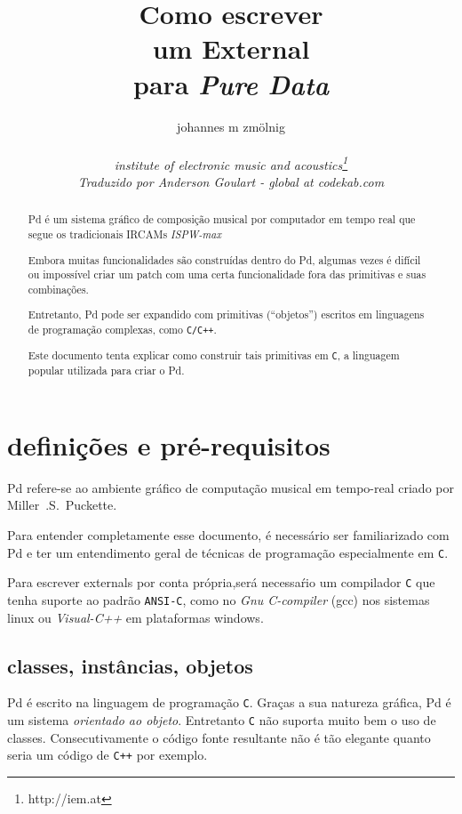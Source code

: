 \documentclass[12pt, a4paper,english,titlepage]{article}
\title{
Como escrever  \\
um External \\
para {\em Pure Data}
}
\author{
johannes m zmölnig \\
\\
{\em institute of electronic music and acoustics\footnote{http://iem.at}}
\\
{\em Traduzido por Anderson Goulart - global at codekab.com}
}
\date{}
\begin{document}
\maketitle

\begin{abstract}
Pd é um sistema gráfico de composição musical por computador em tempo real que segue
os tradicionais IRCAMs {\em ISPW-max}

Embora muitas funcionalidades são construídas dentro do Pd,
algumas vezes é difícil ou impossível criar um patch com uma certa funcionalidade
fora das primitivas e suas combinações.

Entretanto, Pd pode ser expandido com primitivas (``objetos'')
escritos em linguagens de programação complexas, como {\tt C/C++}. 

Este documento tenta explicar como construir tais primitivas em  {\tt C},
a linguagem popular utilizada para criar o Pd.
\end{abstract}


\vfill
\newpage

\tableofcontents

\vfill
\newpage

\section{definições e pré-requisitos}
Pd refere-se ao ambiente gráfico de computação musical em tempo-real criado por
Miller~.S.~Puckette.

Para entender completamente esse documento, é necessário ser
familiarizado com Pd e ter um entendimento geral de técnicas de  programação 
especialmente em {\tt C}.

Para escrever externals por conta própria,será necessaŕio um compilador {\tt C} que tenha 
suporte ao padrão {\tt ANSI-C},  como no {\em Gnu C-compiler} (gcc) nos sistemas
linux ou {\em Visual-C++} em plataformas windows.



\subsection{classes, instâncias, objetos}
Pd é escrito na linguagem de programação {\tt C}.
Graças a sua natureza gráfica, Pd é um sistema {\em orientado ao objeto}.
Entretanto {\tt C} não suporta muito bem o uso de classes.
Consecutivamente o código fonte resultante não é tão elegante quanto seria um código de {\tt C++} por exemplo.
\end{document}
